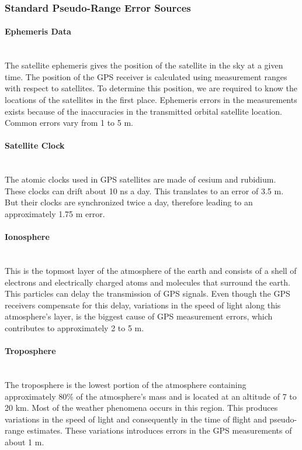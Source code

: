 \subsubsection{Standard Pseudo-Range Error Sources}
\paragraph{Ephemeris Data} \hspace{0pt} \\
The satellite ephemeris gives the position of the satellite in the sky at a given time. The position of the GPS receiver is calculated using measurement ranges with respect to satellites. To determine this position, we are required to know the locations of the satellites in the first place. Ephemeris errors in the measurements exists because of the inaccuracies in the transmitted orbital satellite location. Common errors vary from 1 to 5 m.

\paragraph{Satellite Clock} \hspace{0pt} \\
The atomic clocks used in GPS satellites are made of cesium and rubidium. These clocks can drift about 10 ns a day. This translates to an error of 3.5 m. But their clocks are synchronized twice a day, therefore leading to an approximately 1.75 m error.

\paragraph{Ionosphere} \hspace{0pt} \\
This is the topmost layer of the atmosphere of the earth and consists of a shell of electrons and electrically charged atoms and molecules that surround the earth. This particles can delay the transmission of GPS signals. Even though the GPS receivers compensate for this delay, variations in the speed of light along this atmosphere's layer, is the biggest cause of GPS measurement errors, which contributes to approximately 2 to 5 m.

\paragraph{Troposphere} \hspace{0pt} \\
The troposphere is the lowest portion of the atmosphere containing approximately 80\% of the atmosphere's mass and is located at an altitude of 7 to 20 km. Most of the weather phenomena occurs in this region. This produces variations in the speed of light and consequently in the time of flight and pseudo-range estimates. These variations introduces errors in the GPS measurements of about 1 m.


